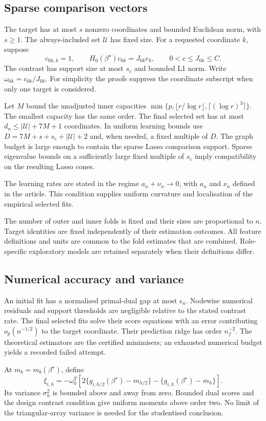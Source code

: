 \subsection{Sparse comparison vectors}

The target has at most $s$ nonzero coordinates and bounded Euclidean
norm, with $s\geq1$. The always-included set $\mathcal U$ has fixed
size. For a requested coordinate $k$, suppose
\begin{equation}\label{eq:supp-contrast}
 c_{0k,k}=1,\qquad H_0(\beta^\star)c_{0k}=J_{0k}e_k,
 \qquad 0<c\leq J_{0k}\leq C.
\end{equation}
The contrast has support size at most $s_c$ and bounded L1 norm.
Write $\omega_{0k}=c_{0k}/J_{0k}$. For simplicity the proofs suppress
the coordinate subscript when only one target is considered.

Let $M$ bound the unadjusted inner capacities
$\min\{p,\lfloor r/\log r\rfloor,\lceil(\log r)^3\rceil\}$.
The smallest capacity has the same order. The final selected set has
at most $d_n\leq|\mathcal U|+7M+1$ coordinates. In uniform learning
bounds use $D=7M+s+s_c+|\mathcal U|+2$ and, when needed, a fixed
multiple of $D$. The graph budget is large enough to contain the
sparse Lasso comparison support. Sparse eigenvalue bounds on a
sufficiently large fixed multiple of $s_c$ imply compatibility on
the resulting Lasso cones.

The learning rates are stated in the regime $a_n+\nu_n\to0$, with
$a_n$ and $\nu_n$ defined in the article. This condition supplies
uniform curvature and localisation of the empirical selected fits.

The number of outer and inner folds is fixed and their sizes are
proportional to $n$. Target identities are fixed independently of their
estimation outcomes. All feature definitions and units are common to
the fold estimates that are combined. Role-specific exploratory
models are retained separately when their definitions differ.

\subsection{Numerical accuracy and variance}

An initial fit has a normalised primal-dual gap at most $\epsilon_n$.
Nodewise numerical residuals and support thresholds are negligible
relative to the stated contrast rate. The final selected fits solve
their score equations with an error contributing $o_p(n^{-1/2})$ to
the target coordinate. Their prediction ridge has order $n_f^{-2}$.
The theoretical estimators are the certified minimisers; an exhausted
numerical budget yields a recorded failed attempt.

At $m_b=m_b(\beta^\star)$, define
\begin{equation}\label{eq:supp-oracle-influence}
 \xi_{i,h}=-\omega_0^T
 [2\{g_{i,h/2}(\beta^\star)-m_{h/2}\}
                    -\{g_{i,h}(\beta^\star)-m_h\}].
\end{equation}
Its variance $\sigma_h^2$ is bounded above and away from zero. Bounded
dual scores and the design contrast condition give uniform moments
above order two. No limit of the triangular-array variance is needed
for the studentised conclusion.
